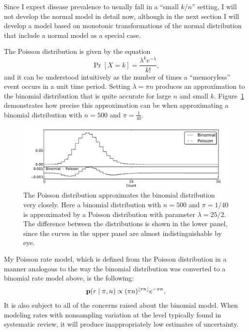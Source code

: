 Since I expect disease prevalence to usually fall in a ``small $k/n$''
setting, I will not develop the normal model in detail now, although
in the next section I will develop a model based on monotonic
transformations of the normal distribution that include a normal
model as a special case.

The Poisson distribution is given by the equation
\[
\Pr[X=k] =
\frac{\lambda^k e^{-\lambda}}{k!},
\]
and it can be understood intuitively as the number of times a
``memoryless'' event occurs in a unit time period.  Setting $\lambda
=\pi n$ produces an approximation to the binomial distribution that
is quite accurate for large $n$ and small
$k$. Figure~\ref{rate-model-poisson-approx-to-binom} demonstrates how
precise this approximation can be when approximating a binomial
distribution with $n=500$ and $\pi=\frac{1}{40}$.

\begin{figure}[h]
\begin{center}
\includegraphics[width=\textwidth]{poisson_approx_to_binom.pdf}
\end{center}
\caption{The Poisson distribution approximates the binomial
  distribution very closely. Here a binomial distribution with $n=500$
  and $\pi=1/40$ is approximated by a Poisson distribution
  with parameter $\lambda=25/2$.  The difference between the
  distributions is shown in the lower panel, since the curves in the
  upper panel are almost indistinguishable by eye.}
\label{rate-model-poisson-approx-to-binom}
\end{figure}

My Poisson rate model, which is defined from the Poisson distribution
in a manner analogous to the way the binomial distribution was
converted to a binomial rate model above, is the following:
\[
\mathbf{p}(r\;|\; \pi,n) \propto
(\pi n)^{\lfloor
  rn\rfloor} e^{-\pi n}.
\]
It is also subject to all of the concerns raised about the binomial
model.  When modeling rates with nonsampling variation at the level
typically found in systematic review, it will produce
inappropriately low estimates of uncertainty.

